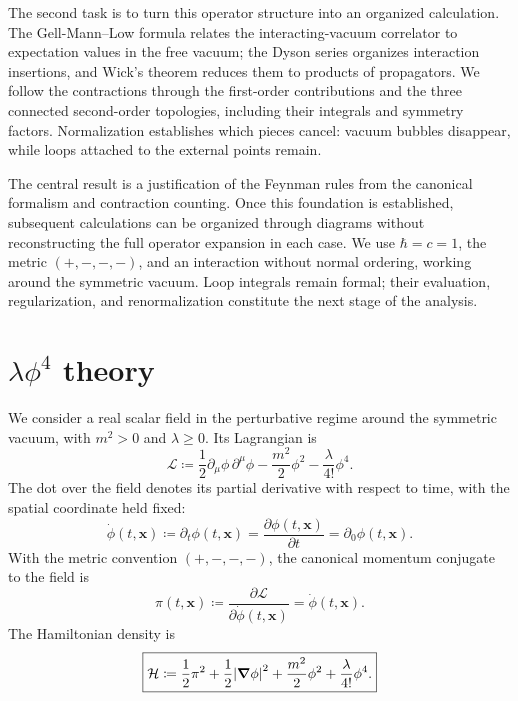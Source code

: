 \documentclass[11pt,letterpaper]{article}
\theoremstyle{definition}
\theoremstyle{definition}
\newcommand{\eqbox}[1]{\boxed{\displaystyle #1}}
\begin{document}
The second task is to turn this operator structure into an organized
calculation. The Gell-Mann--Low formula relates the interacting-vacuum
correlator to expectation values in the free vacuum; the Dyson series
organizes interaction insertions, and Wick's theorem reduces them to
products of propagators. We follow the contractions through the
first-order contributions and the three connected second-order topologies,
including their integrals and symmetry factors. Normalization establishes
which pieces cancel: vacuum bubbles disappear, while loops attached to
the external points remain.

The central result is a justification of the Feynman rules from the
canonical formalism and contraction counting. Once this foundation is
established, subsequent calculations can be organized through diagrams
without reconstructing the full operator expansion in each case.
We use $\hbar=c=1$, the metric $(+,-,-,-)$, and an interaction without
normal ordering, working around the symmetric vacuum. Loop integrals
remain formal; their evaluation, regularization, and renormalization
constitute the next stage of the analysis.

\section{\texorpdfstring{$\lambda\phi^4$}{lambda phi4} theory}

We consider a real scalar field in the perturbative regime around
the symmetric vacuum, with $m^2>0$ and $\lambda\geq0$. Its Lagrangian is
\begin{equation}
  \eqbox{\mathcal{L}
  \coloneqq\frac{1}{2}\partial_\mu\phi\,\partial^\mu\phi
  -\frac{m^2}{2}\phi^2
  -\frac{\lambda}{4!}\phi^4.}
\end{equation}
The dot over the field denotes its partial derivative with respect to
time, with the spatial coordinate held fixed:
\begin{equation}
  \dot\phi(t,\mathbf{x})
  \coloneqq\partial_t\phi(t,\mathbf{x})
  =\frac{\partial\phi(t,\mathbf{x})}{\partial t}
  =\partial_0\phi(t,\mathbf{x}).
\end{equation}
With the metric convention $(+,-,-,-)$, the canonical momentum conjugate to the field is
\begin{equation}
  \pi(t,\mathbf{x})
  \coloneqq\frac{\partial\mathcal L}{\partial\dot\phi(t,\mathbf{x})}
  =\dot\phi(t,\mathbf{x}).
\end{equation}
The Hamiltonian density is
\begin{equation}
  \eqbox{\mathcal{H}
  \coloneqq\frac{1}{2}\pi^2
  +\frac{1}{2}\abs{\grad\phi}^2
  +\frac{m^2}{2}\phi^2
  +\frac{\lambda}{4!}\phi^4.}
\end{equation}
\end{document}
